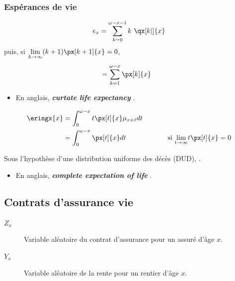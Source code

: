 \documentclass[french]{article}
\begin{document}
\begin{multicols*}{2}
\subsubsection{Espérances de vie}
\setlength{\mathindent}{-1cm}
\begin{definitionNOHFILLsub}
\begin{align*}
	e_{x}
	&=	\sum_{k = 0}^{\omega - x - 1} k \ \qx[k | ]{x}	\\
\end{align*}
puis, si $\limz{k}{\infty} (k + 1) \px[k + 1]{x} = 0$, 
\begin{align*}
	&=	\sum_{k = 1}^{\omega - x} \px[k]{x}
\end{align*}

\begin{itemize}
	\item	En anglais, \og \textit{\textbf{curtate life expectancy}} \fg{}.
\end{itemize}
\end{definitionNOHFILLsub}
\setlength{\mathindent}{1cm}



\setlength{\mathindent}{-1cm}
\begin{definitionNOHFILLsub}
\begin{align*}
	\eringx{x}
	&=	\int_{0}^{\omega - x} t \px[t]{x} \mu_{x + t} dt	\\
	&=	\int_{0}^{\omega - x} \px[t]{x} dt	\qquad\qquad\quad\quad	\text{si } \limz{t}{\infty} t \px[t]{x} = 0
\end{align*}

Sous l'hypothèse d'une distribution uniforme des décès (DUD), .

\begin{itemize}
	\item	En anglais, \og \textit{\textbf{complete expectation of life}} \fg{}.
\end{itemize}
\end{definitionNOHFILLsub}


\columnbreak
\subsection{Contrats d'assurance vie}
\begin{distributions}[Notation]
\begin{description}
	\item[$Z_{x}$]	Variable aléatoire du contrat d'assurance pour un assuré d'âge $x$.
	\item[$Y_{x}$]	Variable aléatoire de la rente pour un rentier d'âge $x$.
\end{description}
\end{distributions}



\end{multicols*}
\end{document}
